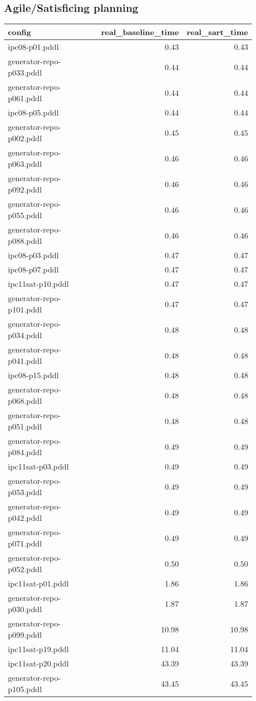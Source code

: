 \documentclass{article}
\begin{document}
                    \subsection*{Agile/Satisficing planning}
                    
                            \begin{center}
                            \scriptsize
                            \begin{tabular}{@{}l|r|r@{}}
                            config & real\_baseline\_time & real\_sart\_time\\\midrule
                             ipc08-p01.pddl&0.43&0.43\\
 generator-repo-p033.pddl&0.44&0.44\\
 generator-repo-p061.pddl&0.44&0.44\\
 ipc08-p05.pddl&0.44&0.44\\
 generator-repo-p002.pddl&0.45&0.45\\
 generator-repo-p063.pddl&0.46&0.46\\
 generator-repo-p092.pddl&0.46&0.46\\
 generator-repo-p055.pddl&0.46&0.46\\
 generator-repo-p088.pddl&0.46&0.46\\
 ipc08-p03.pddl&0.47&0.47\\
 ipc08-p07.pddl&0.47&0.47\\
 ipc11sat-p10.pddl&0.47&0.47\\
 generator-repo-p101.pddl&0.47&0.47\\
 generator-repo-p034.pddl&0.48&0.48\\
 generator-repo-p041.pddl&0.48&0.48\\
 ipc08-p15.pddl&0.48&0.48\\
 generator-repo-p068.pddl&0.48&0.48\\
 generator-repo-p051.pddl&0.48&0.48\\
 generator-repo-p084.pddl&0.49&0.49\\
 ipc11sat-p03.pddl&0.49&0.49\\
 generator-repo-p053.pddl&0.49&0.49\\
 generator-repo-p042.pddl&0.49&0.49\\
 generator-repo-p071.pddl&0.49&0.49\\
 generator-repo-p052.pddl&0.50&0.50\\
 ipc11sat-p01.pddl&1.86&1.86\\
 generator-repo-p030.pddl&1.87&1.87\\
 generator-repo-p099.pddl&10.98&10.98\\
 ipc11sat-p19.pddl&11.04&11.04\\
 ipc11sat-p20.pddl&43.39&43.39\\
 generator-repo-p105.pddl&43.45&43.45
                            \end{tabular}
                            \end{center}
                    
\end{document}
